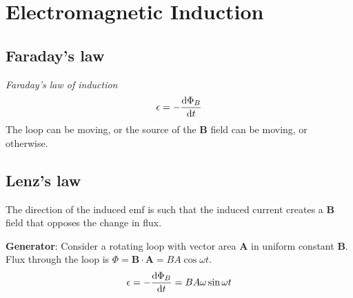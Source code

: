 \section{Electromagnetic Induction} 

\subsection*{Faraday's law}
\textit{Faraday's law of induction}
\begin{equation*}
    \epsilon = - \dv{\Phi_B}{t}
\end{equation*}
The loop can be moving, or the source of the $\mathbf{B}$ field can be moving, or otherwise.
\subsection*{Lenz's law}
The direction of the induced emf is such that the induced current creates a $\mathbf{B}$ field that opposes the change in flux.

\textbf{Generator}: Consider a rotating loop with vector area $\mathbf{A}$ in uniform constant $\mathbf{B}$. Flux through the loop is $\Phi = \mathbf{B} \cdot \mathbf{A} = BA \cos \omega t$.
\begin{equation*}
    \epsilon = - \dv{\Phi_B}{t} = BA \omega \sin \omega t
\end{equation*}

